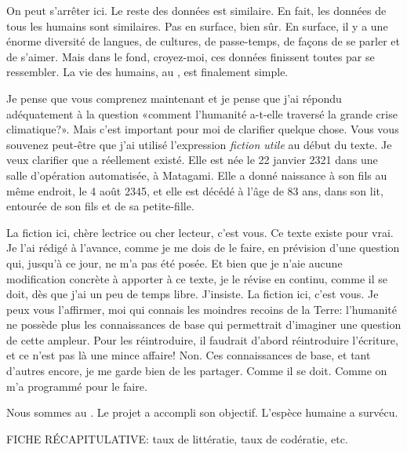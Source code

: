 On peut s'arrêter ici. Le reste des données est similaire.  En fait, les
données de tous les humains sont similaires. Pas en surface, bien sûr.  En surface,
il y a une énorme diversité de langues, de cultures, de passe-temps, de façons
de se parler et de s'aimer. Mais dans le fond, croyez-moi, ces données
finissent toutes par se ressembler.  La vie des humains, au \siecle{}, est
finalement simple.

Je pense que vous comprenez maintenant et je pense que j'ai répondu
adéquatement à la question «comment l'humanité a-t-elle traversé la grande
crise climatique?».  Mais c'est important pour moi de clarifier quelque chose.
Vous vous souvenez peut-être que j'ai utilisé l'expression \textit{fiction
utile} au début du texte.  Je veux clarifier que \nomMere{} a réellement existé.
Elle est née le 22 janvier 2321 dans une salle d'opération automatisée, à
Matagami. Elle a donné naissance à son fils au même endroit, le 4 août 2345, et
elle est décédé à l'âge de 83 ans, dans son lit, entourée de
son fils et de sa petite-fille.

La fiction ici, chère lectrice ou cher lecteur, c'est vous. Ce texte existe
pour vrai.  Je l'ai rédigé à l'avance, comme je me dois de le faire, en
prévision d'une question qui, jusqu'à ce jour, ne m'a pas été posée.  Et bien
que je n'aie aucune modification concrète à apporter à ce texte, je le révise
en continu, comme il se doit, dès que j'ai un peu de temps libre.  J'insiste.
La fiction ici, c'est vous.  Je peux vous l'affirmer, moi qui connais les
moindres recoins de la Terre: l'humanité ne possède plus les
connaissances de base qui permettrait d'imaginer une question de cette ampleur.
Pour les réintroduire, il faudrait d'abord réintroduire l'écriture, et ce n'est
pas là une mince affaire! Non. Ces connaissances de base, et tant d'autres encore,
je me garde bien de les partager.  Comme il se doit. Comme on m'a programmé
pour le faire.

Nous sommes au \siecle{}. Le projet \nomProjet{} a accompli son objectif. L'espèce humaine a survécu.


FICHE RÉCAPITULATIVE: taux de littératie, taux de codératie, etc.
